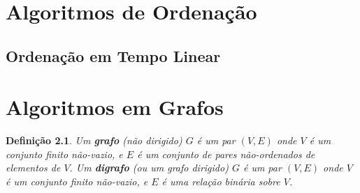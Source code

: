 \documentclass[12pt]{book}
\newtheorem{definicao}{Definição}
\begin{document}
\chapter{Algoritmos de Ordenação}

\section{Ordenação em Tempo Linear}

\chapter{Algoritmos em Grafos}

\begin{definicao}
  Um \textbf{grafo} (não dirigido) $G$ é um par $(V,E)$ onde $V$ é um conjunto finito não-vazio, e $E$ é um conjunto de pares não-ordenados de elementos de $V$. Um \textbf{digrafo} (ou um grafo dirigido) $G$ é um par $(V,E)$ onde $V$ é um conjunto finito não-vazio, e $E$ é uma relação binária sobre $V$.
  \end{definicao}
\end{document}
